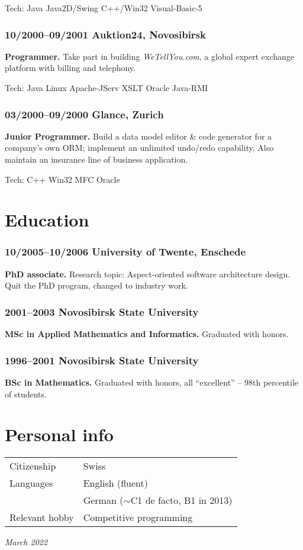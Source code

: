 \documentclass[a4paper, twocolumn, 10pt]{article}
\begin{document}
Tech: Java Java2D/Swing C++/Win32 Visual-Basic-5

\subsubsection*{10/2000--09/2001 Auktion24, Novosibirsk}

\textbf{Programmer.} Take part in building \emph{WeTellYou.com}, a global expert exchange platform
with billing and telephony.

Tech: Java Linux Apache-JServ XSLT Oracle Java-RMI

\subsubsection*{03/2000--09/2000 Glance, Zurich}

\textbf{Junior Programmer.} Build a data model editor \& code generator for a company's own ORM;
implement an unlimited undo/redo capability. Also maintain an insurance line of business
application.

Tech: C++ Win32 MFC Oracle

\section*{Education}

\subsubsection*{10/2005--10/2006 University of Twente, Enschede}

\textbf{PhD associate.} Research topic: Aspect-oriented software architecture design. Quit the PhD
program, changed to industry work.

\subsubsection*{2001--2003 Novosibirsk State University}

\textbf{MSc in Applied Mathematics and Informatics.} Graduated with honors.

\subsubsection*{1996--2001 Novosibirsk State University}

\textbf{BSc in Mathematics.} Graduated with honors, all ``excellent'' -- 98th percentile of
students.

\section*{Personal info}

\begin{tabular}{l l}
  \vspace{0.2cm}
  Citizenship & Swiss \\
  Languages & English (fluent) \\
  \vspace{0.2cm}
  & German ($\sim$C1 de facto, B1 in 2013) \\
  Relevant hobby & Competitive programming \\
\end{tabular}

\vspace*{\fill}
\hfill \emph{March 2022}
\end{document}
